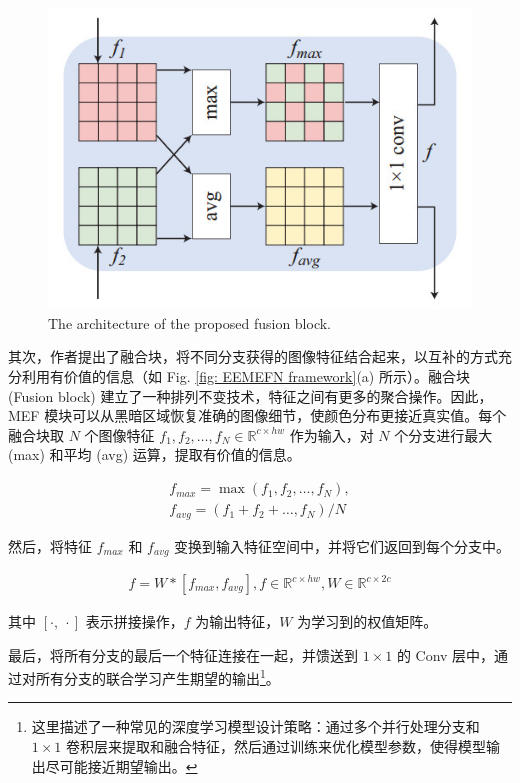 \documentclass[letterpaper,10pt]{article}
\begin{document}
			\begin{figure}[htbp]
				\centering 
				\includegraphics[width=0.45\columnwidth]{picture/LLIE/EEMEFN/Fusion block}
				\caption{
					\label{fig: Fusion block} 
					The architecture of the proposed fusion block.
				}
			\end{figure}
			
			其次，作者提出了融合块，将不同分支获得的图像特征结合起来，以互补的方式充分利用有价值的信息（如 Fig. \ref{fig: EEMEFN framework}(a) 所示）。融合块 (Fusion block) 建立了一种排列不变技术，特征之间有更多的聚合操作。因此，MEF 模块可以从黑暗区域恢复准确的图像细节，使颜色分布更接近真实值。每个融合块取 $N$ 个图像特征 $f_1, f_2, \ldots, f_N \in \mathbb{R}^{c \times hw}$ 作为输入，对 $N$ 个分支进行最大 (max) 和平均 (avg) 运算，提取有价值的信息。
			
			\begin{equation}
				\begin{aligned}
					f_{max} = \max (f_1, f_2, \ldots, f_N) , \\
					f_{avg} = \left( f_1 + f_2 + \ldots , f_N\right) / N
				\end{aligned}
				\label{eq: max and avg}
			\end{equation}
			
			然后，将特征 $f_{max}$ 和 $f_{avg}$ 变换到输入特征空间中，并将它们返回到每个分支中。
			
			\begin{equation}
				\begin{aligned}
					f = W * \left[f_{max}, f_{avg}\right], f \in \mathbb{R}^{c \times hw}, W \in \mathbb{R}^{c \times 2c}
				\end{aligned}
				\label{eq: fusion}
			\end{equation}
			
			其中 $\left[ \cdot , \ \cdot \right]$ 表示拼接操作，$f$ 为输出特征，$W$ 为学习到的权值矩阵。
			
			最后，将所有分支的最后一个特征连接在一起，并馈送到 $1 \times 1$ 的 Conv 层中，通过对所有分支的联合学习产生期望的输出\footnote{这里描述了一种常见的深度学习模型设计策略：通过多个并行处理分支和 $1 \times 1$ 卷积层来提取和融合特征，然后通过训练来优化模型参数，使得模型输出尽可能接近期望输出。}。
			
\end{document}
